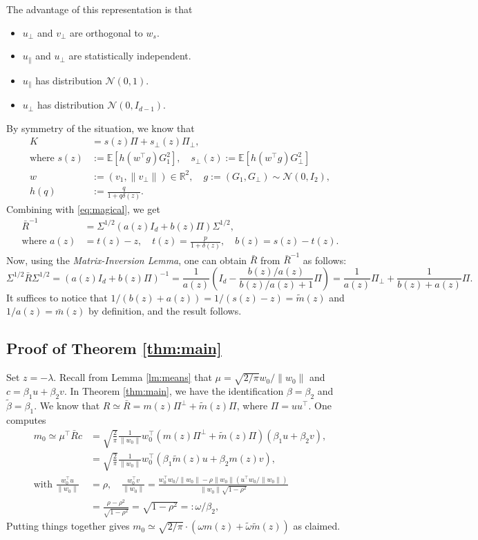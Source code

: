 The advantage of this representation is that
\begin{itemize}
\item  $u_\perp$ and $v_\perp$ are orthogonal to $w_s$.
\item $u_\parallel $ and $u_\perp$ are  statistically independent.
\item $u_\parallel $ has distribution $\mathcal N(0,1)$.
\item $u_\perp$ has distribution $\mathcal N(0,I_{d-1})$.
\end{itemize}
By symmetry of the situation, we know that
\begin{align*}
K&= s(z)  \Pi + s_\perp(z) \Pi_\perp,\\
\text{where }
s(z)  &:= \mathbb E [h(w^\top g)G_1 ^2],\quad
s_\perp(z) := \mathbb E [h(w^\top g) G_\perp^2]\\
w &:= (v_1 ,\|v_\perp\|) \in \mathbb R^2,\quad g := (G_1 ,G_\perp) \sim \mathcal N(0,I_2),\\
h(q) &:= \frac{q}{1+q\delta(z)}.
\end{align*}
Combining with \eqref{eq:magical}, we get
\begin{align}
\bar R^{-1}
&= \Sigma^{1/2}(a(z)I_d+b(z)\Pi)\Sigma^{1/2},\\
\text{where }
a(z) &= t(z) - z,\quad t(z) = \frac{p}{1+\delta(z)},\quad b(z) = s(z)-t(z).
\end{align}
Now, using the \emph{Matrix-Inversion Lemma}, one can obtain $\bar R$ from $\bar R^{-1}$ as follows:
$$
\Sigma^{1/2}\bar R\Sigma^{1/2}=(a(z)I_d+b(z)\Pi)^{-1} = \frac{1}{a(z)}\left(I_d - \frac{b(z)/a(z)}{b(z)/a(z)+1}\Pi\right) = \frac{1}{a(z)}\Pi_\perp + \frac{1}{b(z)+a(z)}\Pi.
$$
It suffices to notice that $1/(b(z)+a(z))=1/(s(z)-z) =\tilde m(z)$ and $1/a(z) = \bar m(z)$ by definition, and the result follows.

\subsection{Proof of Theorem \ref{thm:main}}
Set $z=-\lambda$. Recall from Lemma \ref{lm:means} that $\mu = \sqrt{2/\pi}w_0/\|w_0\|$ and $c = \beta_1 u + \beta_2 v$. In Theorem \ref{thm:main}, we have the identification $\beta=\beta_2$ and $\tilde \beta=\beta_1$. We know that $R \simeq \bar R = m(z)\Pi^\perp + \tilde m(z)\Pi$, where $\Pi=uu^\top$. One computes
\begin{align*}
       m_0 \simeq \mu^\top \bar R c &= \sqrt{\frac{2}{\pi}}\frac{1}{\|w_0\|}w_0^\top\left(m(z)\Pi^\perp + \tilde m(z) \Pi \right)(\beta_1 u + \beta_2 v),\\
       &= \sqrt{\frac{2}{\pi}}\frac{1}{\|w_0\|}w_0^\top\left(\beta_1 \tilde m(z)u + \beta_2m(z)v\right),\\
        \text{with }\frac{w_0^\top u}{\|w_0\|} &=\rho,\quad
        \frac{w_0^\top v}{\|w_0\|} = \frac{w_0^\top w_0/\|w_0\|-\rho\|w_0\|(u^\top w_0/\|w_0\|)}{\|w_0\|\sqrt{1-\rho^2}}\\
        &= \frac{\rho-\rho^2}{\sqrt{1-\rho^2}} =\sqrt{1-\rho^2} =:\omega/\beta_2,
\end{align*}
Putting things together gives $m_0 \simeq \sqrt{2/\pi}\cdot \left(\omega m(z) + \tilde\omega \tilde m(z)\right)$ as claimed.



